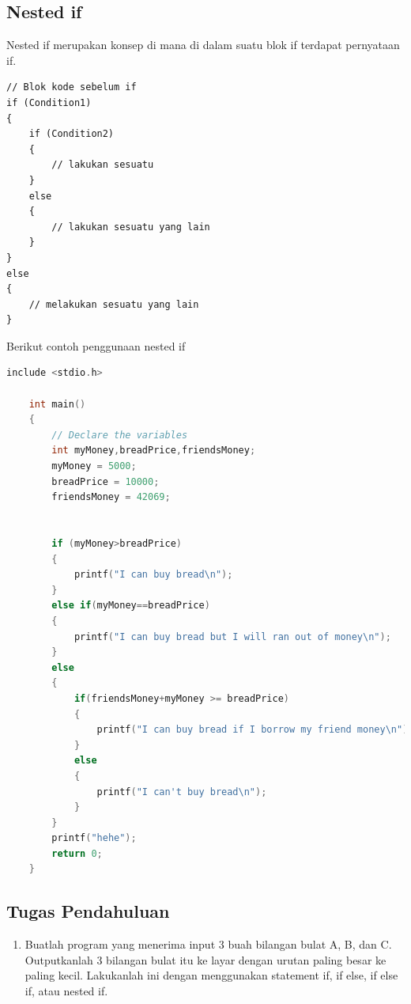\subsection{Nested if}
Nested if merupakan konsep di mana di dalam suatu blok if terdapat pernyataan if.
\begin{verbatim}
// Blok kode sebelum if
if (Condition1)
{
    if (Condition2)
    {
        // lakukan sesuatu
    }
    else
    {
        // lakukan sesuatu yang lain
    }
} 
else
{
    // melakukan sesuatu yang lain
}
\end{verbatim}

Berikut contoh penggunaan nested if

\begin{lstlisting}[language=c,caption = Contoh nested if,label=lst:nestedifexample01]
	include <stdio.h>
	
	int main()
	{
		// Declare the variables
		int myMoney,breadPrice,friendsMoney;
		myMoney = 5000;
		breadPrice = 10000;
		friendsMoney = 42069;
		
		
		if (myMoney>breadPrice)
		{
		    printf("I can buy bread\n");
		}
		else if(myMoney==breadPrice)
		{
		    printf("I can buy bread but I will ran out of money\n");
		}
		else
		{
		    if(friendsMoney+myMoney >= breadPrice)
		    {
		        printf("I can buy bread if I borrow my friend money\n"); 
		    }
		    else
		    {
	            printf("I can't buy bread\n");	
		    }
		}
		printf("hehe");
		return 0;
	}
\end{lstlisting}


\subsection{Tugas Pendahuluan}
\begin{enumerate}
	\item Buatlah program yang menerima input 3 buah bilangan bulat A, B, dan C. Outputkanlah 3 bilangan bulat itu ke layar dengan urutan paling besar ke paling kecil. Lakukanlah ini dengan menggunakan statement if, if else, if else if, atau nested if.
\end{enumerate}

